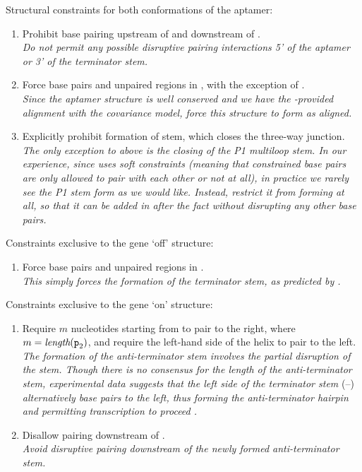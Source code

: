 \documentclass[11pt, oneside]{Thesis} %
\begin{document}
{\large Structural constraints for both conformations of the \grb aptamer:}
\begin{enumerate}
\item Prohibit base pairing upstream of  and
downstream of . \\[1.5ex] {\em Do not permit any possible disruptive pairing
interactions 5' of the aptamer or 3' of the terminator stem.}
\item Force base pairs and unpaired regions in , with
the exception of . \\[1.5ex] {\em Since the aptamer structure is well
conserved and we have the \infernal-provided alignment with the
covariance model, force this structure to form as aligned.}
\item Explicitly prohibit formation of  stem, which closes the
three-way junction. \\[1.5ex] {\em The only exception to above is the closing of the
P1 multiloop stem. In our experience, since \rfold uses soft constraints
(meaning that constrained base pairs are only allowed to pair with each other
or not at all), in practice we rarely see the P1 stem form as we would like.
Instead, restrict it from forming at all, so that it can be added in after the
fact without disrupting any other base pairs.}
\end{enumerate}
{\large Constraints exclusive to the gene `off' structure:}
\begin{enumerate}
\item Force base pairs and unpaired regions in . \\[1.5ex] {\em This simply
forces the formation of the terminator stem, as predicted by \tthp.}
\end{enumerate}
{\large Constraints exclusive to the gene `on' structure:}
\begin{enumerate}
\item Require $m$ nucleotides starting from  to pair to the
right, where $m = \textit{length}({\text{\mbox{\tt p}}}_{\text{2}})$, and require the left-hand side of the
 helix to pair to the left. \\[1.5ex] {\em The formation of the
anti-terminator stem involves the partial disruption of the  stem.
Though there is no consensus for the length of the anti-terminator stem,
experimental data suggests that the left side of the terminator stem}
(--) {\em alternatively base pairs to the left,
thus forming the anti-terminator hairpin and permitting transcription to proceed
\citep{mandal:2004ja}.}
\item Disallow pairing downstream of . \\[1.5ex] {\em Avoid
disruptive pairing downstream of the newly formed anti-terminator stem.}
\end{enumerate}
\end{document}
